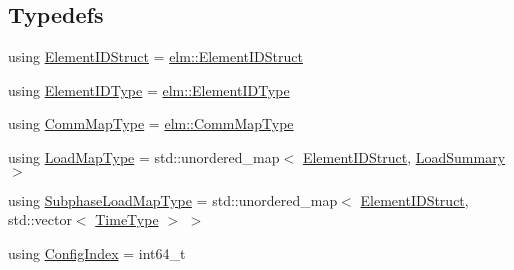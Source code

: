 \subsection*{Typedefs}
\begin{DoxyCompactItemize}
\item 
using \hyperlink{namespacevt_1_1vrt_1_1collection_1_1balance_a9f5b53fafb270212279a4757d2c4cd28}{Element\+I\+D\+Struct} = \hyperlink{structvt_1_1elm_1_1_element_i_d_struct}{elm\+::\+Element\+I\+D\+Struct}
\item 
using \hyperlink{namespacevt_1_1vrt_1_1collection_1_1balance_a592736f733df4f90856df90a1fd08905}{Element\+I\+D\+Type} = \hyperlink{namespacevt_1_1elm_a63afb64985b41b7b6dcf2f01336391f8}{elm\+::\+Element\+I\+D\+Type}
\item 
using \hyperlink{namespacevt_1_1vrt_1_1collection_1_1balance_a01ee1fb0ae2da1d2ab7fdca3be9ae351}{Comm\+Map\+Type} = \hyperlink{namespacevt_1_1elm_a38487cb8896b9b4763efa9022fab560e}{elm\+::\+Comm\+Map\+Type}
\item 
using \hyperlink{namespacevt_1_1vrt_1_1collection_1_1balance_a5339303db2e1ce964d783a53fd74e6b1}{Load\+Map\+Type} = std\+::unordered\+\_\+map$<$ \hyperlink{namespacevt_1_1vrt_1_1collection_1_1balance_a9f5b53fafb270212279a4757d2c4cd28}{Element\+I\+D\+Struct}, \hyperlink{structvt_1_1vrt_1_1collection_1_1balance_1_1_load_summary}{Load\+Summary} $>$
\item 
using \hyperlink{namespacevt_1_1vrt_1_1collection_1_1balance_a8bdadb2583f128dd256e7d5a10826542}{Subphase\+Load\+Map\+Type} = std\+::unordered\+\_\+map$<$ \hyperlink{namespacevt_1_1vrt_1_1collection_1_1balance_a9f5b53fafb270212279a4757d2c4cd28}{Element\+I\+D\+Struct}, std\+::vector$<$ \hyperlink{namespacevt_a876a9d0cd5a952859c72de8a46881442}{Time\+Type} $>$ $>$
\item 
using \hyperlink{namespacevt_1_1vrt_1_1collection_1_1balance_ac1bb9eee8129549177880dbb4e5f6a34}{Config\+Index} = int64\+\_\+t
\end{DoxyCompactItemize}
